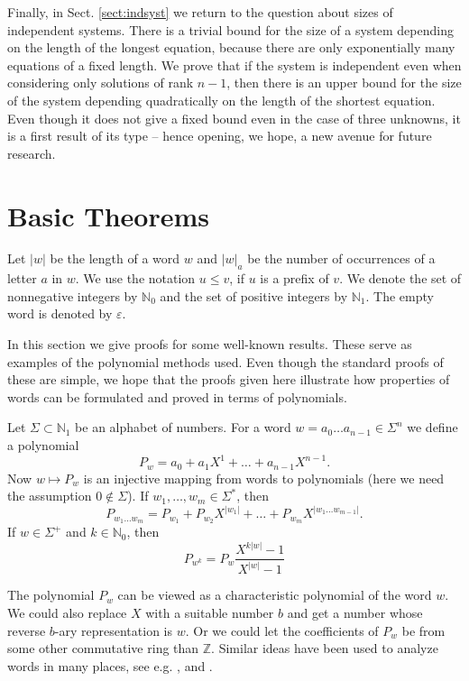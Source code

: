 \documentclass[submission]{eptcs}
\theoremstyle{definition}
\newcommand{\eps}{\varepsilon}
\newcommand{\Z}{\mathbb Z}
\newcommand{\No}{\mathbb N_0}
\newcommand{\Ni}{\mathbb N_1}
\newcommand{\px}[1]{ P_{#1} }
\begin{document}
Finally, in Sect. \ref{sect:indsyst} we return to the question about
sizes of independent systems. There is a trivial bound for the size
of a system depending on the length of the longest equation, because
there are only exponentially many equations of a fixed length. We
prove that if the system is independent even when considering only
solutions of rank $n-1$, then there is an upper bound for the size
of the system depending quadratically on the length of the shortest
equation. Even though it does not give a fixed bound even in the
case of three unknowns, it is a first result of its type -- hence
opening, we hope, a new avenue for future research.

\section{Basic Theorems} \label{sect:basic}

Let $|w|$ be the length of a word $w$ and $|w|_a$ be the number of
occurrences of a letter $a$ in $w$. We use the notation $u \leq v$,
if $u$ is a prefix of $v$. We denote the set of nonnegative integers
by $\No$ and the set of positive integers by $\Ni$. The empty word
is denoted by $\eps$.

In this section we give proofs for some well-known results. These
serve as examples of the polynomial methods used. Even though the
standard proofs of these are simple, we hope that the proofs given
here illustrate how properties of words can be formulated and proved
in terms of polynomials.

Let $\Sigma \subset \Ni$ be an alphabet of numbers. For a word $w =
a_{0} \dots a_{n-1} \in \Sigma^n$ we define a polynomial
\begin{equation*}
    \px{w} = a_{0} + a_1 X^{1} + \dots + a_{n-1} X^{n-1}.
\end{equation*}
Now $w \mapsto \px{w}$ is an injective mapping from words to
polynomials (here we need the assumption $0 \notin \Sigma$). If
$w_1, \dots, w_m \in \Sigma^*$, then
\begin{equation} \label{eq:prodp}
    \px{w_1 \dots w_m}
    = \px{w_1} + \px{w_2} X^{|w_1|}
        + \dots + \px{w_m} X^{|w_1 \dots w_{m-1}|} .
\end{equation}
If $w \in \Sigma^+$ and $k \in \No$, then
\begin{equation*}
    \px{w^k} = \px{w} \frac{X^{k|w|} - 1}{X^{|w|} - 1}
\end{equation*}

The polynomial $\px{w}$ can be viewed as a characteristic polynomial
of the word $w$. We could also replace $X$ with a suitable number
$b$ and get a number whose reverse $b$-ary representation is $w$. Or
we could let the coefficients of $\px{w}$ be from some other
commutative ring than $\Z$. Similar ideas have been used to analyze
words in many places, see e.g. \cite{Ku97}, \cite{Sa85} and
\cite{HoKo09}.
\end{document}
